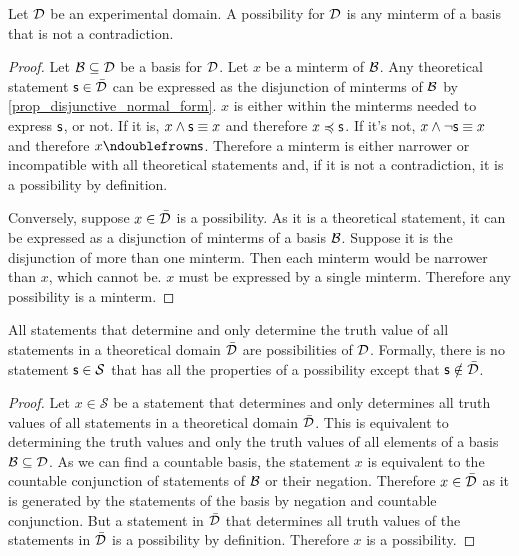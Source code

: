 \documentclass[11pt,letterpaper,fleqn]{memoir} %
\begin{document}
\begin{mathSection}
	
\begin{prop}\label{prop_poss_is_minterm}
	Let $\mathcal{D}$ be an experimental domain. A possibility for $\mathcal{D}$ is any minterm of a basis that is not a contradiction.
\end{prop}

\begin{proof}
	Let $\mathcal{B} \subseteq \mathcal{D}$ be a basis for $\mathcal{D}$. Let $x$ be a minterm of $\mathcal{B}$. Any theoretical statement $\mathsf{s} \in \bar{\mathcal{D}}$ can be expressed as the disjunction of minterms of $\mathcal{B}$ by \ref{prop_disjunctive_normal_form}. $x$ is either within the minterms needed to express $\mathsf{s}$, or not. If it is, $x \wedge \mathsf{s} \equiv x$ and therefore $x \preccurlyeq \mathsf{s}$. If it's not, $x \wedge \neg \mathsf{s} \equiv x$ and therefore $x \ncomp \stmt$. Therefore a minterm is either narrower or incompatible with all theoretical statements and, if it is not a contradiction, it is a possibility by definition.
	
	Conversely, suppose $x \in \bar{\mathcal{D}}$ is a possibility. As it is a theoretical statement, it can be expressed as a disjunction of minterms of a basis $\mathcal{B}$. Suppose it is the disjunction of more than one minterm. Then each minterm would be narrower than $x$, which cannot be. $x$ must be expressed by a single minterm. Therefore any possibility is a minterm.
\end{proof}

\begin{prop}
	All statements that determine and only determine the truth value of all statements in a theoretical domain $\bar{\mathcal{D}}$ are possibilities of $\mathcal{D}$. Formally, there is no statement $\mathsf{s} \in \mathcal{S}$ that has all the properties of a possibility except that $\mathsf{s} \notin \bar{\mathcal{D}}$.
\end{prop}

\begin{proof}
	Let $x \in \mathcal{S}$ be a statement that determines and only determines all truth values of all statements in a theoretical domain $\bar{\mathcal{D}}$. This is equivalent to determining the truth values and only the truth values of all elements of a basis $\mathcal{B} \subseteq \mathcal{D}$. As we can find a countable basis, the statement $x$ is equivalent to the countable conjunction of statements of $\mathcal{B}$ or their negation. Therefore $x \in \bar{\mathcal{D}}$ as it is generated by the statements of the basis by negation and countable conjunction. But a statement in $\bar{\mathcal{D}}$ that determines all truth values of the statements in $\bar{\mathcal{D}}$ is a possibility by definition. Therefore $x$ is a possibility.
\end{proof}
\end{mathSection}
\end{document}
